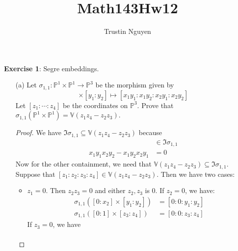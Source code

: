 \documentclass{article}
\title{Math143Hw12}
\author{Trustin Nguyen}
\begin{document}
    \maketitle

\reversemarginpar

\textbf{Exercise 1}: Segre embeddings.
    \begin{itemize}
        \item [(a)] Let $\sigma_{1, 1} : \mathbb{P}^{1} \times \mathbb{P}^{1} \rightarrow \mathbb{P}^{3}$ be the morphism given by
            \begin{equation*}
                [x_{1} : x_{2}] \times [y_{1} : y_{2}] \mapsto [x_{1}y_{1} : x_{1}y_{2} : x_{2}y_{1} : x_{2}y_{2}]
            \end{equation*}
        Let $[z_{1} : \cdots : z_{4}]$ be the coordinates on $\mathbb{P}^{3}$. Prove that $\sigma_{1, 1}(\mathbb{P}^{1} \times \mathbb{P}^{1}) = \mathbb{V}(z_{1}z_{4} - z_{2}z_{3})$.
            \begin{proof}
                We have $\Im{\sigma_{ 1, 1}} \subseteq \mathbb{ V}(z_{1}z_{4} - z_{2}z_{3})$ because
                    \begin{align*}
                        [x_{1}y_{1} : x_{1}y_{2} : x_{2}y_{1} : x_{2}y_{2}] &\in  \Im{\sigma_{ 1, 1}} \\
                        x_{1}y_{1}x_{2}y_{2} - x_{1}y_{2}x_{2}y_{1}                             &=   0                      
                    \end{align*}
                Now for the other containment, we need that $\mathbb{V}(z_{1}z_{4} - z_{2}z_{3}) \subseteq \Im{\sigma_{ 1, 1}}$. Suppose that $[z_{1} : z_{2} : z_{3} : z_{4}] \in \mathbb{ V}(z_{1}z_{4} - z_{2}z_{3})$. Then we have two cases:
                    \begin{itemize}
                        \item $z_{1} = 0$. Then $z_{2}z_{3} = 0$ and either $z_{2}, z_{3}$ is $0$. If $z_{2} = 0$, we have:
                            \begin{align*}
                                \sigma_{1, 1}([0 : x_{2}] \times [ y_{1} : y_{2}]) &= [0 : 0 : y_{1} : y_{2}] \\
                                \sigma_{1, 1}([0 :  1] \times [z_{3} : z_{4}]) &= [ 0 : 0 : z_{3} : z_{4}]
                            \end{align*}
                        If $z_{3} = 0$, we have
                            \begin{align*}

\end{align*}
\end{itemize}
\end{proof}
\end{itemize}
\end{document}
